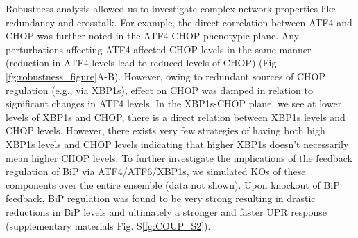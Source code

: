 \documentclass[fleqn,10pt]{wlscirep}
\begin{document}
Robustness analysis allowed us to investigate complex network properties like redundancy and crosstalk.
For example, the direct correlation between ATF4 and CHOP was further noted in the ATF4-CHOP phenotypic plane.
Any perturbations affecting ATF4 affected CHOP levels in the same manner (reduction in ATF4 levels lead to reduced levels of CHOP) (Fig. \ref{fg:robustness_figure}A-B).
However, owing to redundant sources of CHOP regulation (e.g., via XBP1s), effect on CHOP was damped in relation to significant changes in ATF4 levels.
In the XBP1s-CHOP plane, we see at lower levels of XBP1s and CHOP, there is a direct relation between XBP1s levels and CHOP levels.
However, there exists very few strategies of having both high XBP1s levels and CHOP levels indicating that higher XBP1s doesn't necessarily mean higher CHOP levels.
To further investigate the implications of the feedback regulation of BiP via ATF4/ATF6/XBP1s, we simulated KOs of these components over the entire ensemble (data not shown).
Upon knockout of BiP feedback, BiP regulation was found to be very strong resulting in drastic reductions in BiP levels and ultimately a stronger and faster UPR response (supplementary materials Fig. S\ref{fg:COUP_S2}).

\iffalse (supplementary materials Fig. S\ref{fg:COUP_S2}). KO of ATF6 and XBP1s mediated feedback of BiP was seen to have little effect (as marked by robustness coefficients for BiP, supplementary materials Fig. S\ref{fg:COUP_S2}).
However, ATF4 mediated feedback KO led to significant amount of reduction in BiP levels (supplementary materials Fig. S\ref{fg:COUP_S2}) thereby highlighting the significance of ATF4 in BiP feedback.
Upon KO of all branches of BiP feedback, we found overall reductions of BiP levels.
However, there were two distinct populations. One with a $\sim$ 10 fold reduction in BiP levels while the other had $\sim$ 1000 fold reduction in BiP levels.
These two populations could resemble two distinct operational paradigms within UPR. In the first mode of operation feedback, BiP regulation is really strong resulting in drastic reductions in BiP levels and ultimately a stronger and faster UPR response upon knockout of BiP feedback.
\fi

\end{document}
